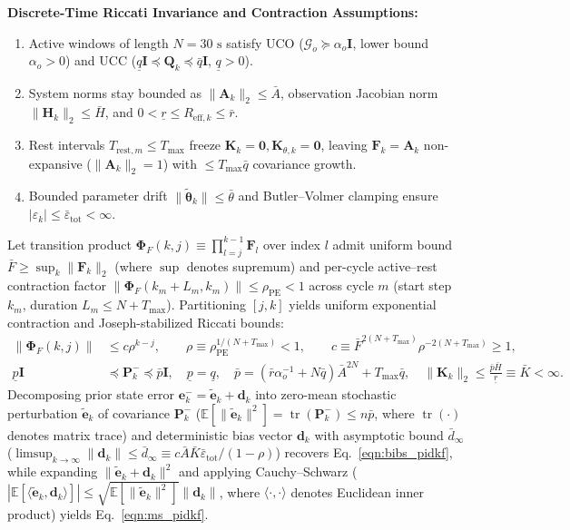 \documentclass[10pt,a4paper]{article}
\begin{document}
\noindent\textbf{Discrete-Time Riccati Invariance and Contraction Assumptions:}
\begin{enumerate}
\item[(A1)] Active windows of length $N = 30\text{ s}$ satisfy UCO ($\mathcal{G}_o \succeq \alpha_o \mathbf{I}$, lower bound $\alpha_o > 0$) and UCC ($\underline{q}\mathbf{I} \preceq \mathbf{Q}_k \preceq \bar{q}\mathbf{I}$, $\underline{q} > 0$).
\item[(A2)] System norms stay bounded as $\|\mathbf{A}_k\|_2 \le \bar{A}$, observation Jacobian norm $\|\mathbf{H}_k\|_2 \le \bar{H}$, and $0 < \underline{r} \le R_{\text{eff},k} \le \bar{r}$.
\item[(A3)] Rest intervals $T_{\text{rest},m} \le T_{\max}$ freeze $\mathbf{K}_k = \mathbf{0}, \mathbf{K}_{\theta,k} = \mathbf{0}$, leaving $\mathbf{F}_k = \mathbf{A}_k$ non-expansive ($\|\mathbf{A}_k\|_2 = 1$) with $\le T_{\max}\bar{q}$ covariance growth.
\item[(A4)] Bounded parameter drift $\|\tilde{\boldsymbol{\theta}}_k\| \le \bar{\theta}$ and Butler--Volmer clamping ensure $|\varepsilon_k| \le \bar{\varepsilon}_{\text{tot}} < \infty$.
\end{enumerate}
Let transition product $\boldsymbol{\Phi}_F(k, j) \equiv \prod_{l=j}^{k-1}\mathbf{F}_l$ over index $l$ admit uniform bound $\bar{F} \ge \sup_k \|\mathbf{F}_k\|_2$ (where $\sup$ denotes supremum) and per-cycle active--rest contraction factor $\|\boldsymbol{\Phi}_F(k_m + L_m, k_m)\| \le \rho_{\text{PE}} < 1$ across cycle $m$ (start step $k_m$, duration $L_m \le N + T_{\max}$). Partitioning $[j, k]$ yields uniform exponential contraction and Joseph-stabilized Riccati bounds:
\begin{align*}
\|\boldsymbol{\Phi}_F(k, j)\| &\le c\rho^{k-j}, \qquad
\rho \equiv \rho_{\text{PE}}^{1/(N + T_{\max})} < 1, \qquad
c \equiv \bar{F}^{2(N + T_{\max})} \rho^{-2(N + T_{\max})} \ge 1, \\
\underline{p}\mathbf{I} &\preceq \mathbf{P}_k^- \preceq \bar{p}\mathbf{I}, \quad
\underline{p} = \underline{q}, \quad \bar{p} = (\bar{r}\alpha_o^{-1} + N\bar{q})\bar{A}^{2N} + T_{\max}\bar{q}, \quad
\|\mathbf{K}_k\|_2 \le \frac{\bar{p}\bar{H}}{\underline{r}} \equiv \bar{K} < \infty.
\end{align*}
Decomposing prior state error $\mathbf{e}_k^- = \tilde{\mathbf{e}}_k + \mathbf{d}_k$ into zero-mean stochastic perturbation $\tilde{\mathbf{e}}_k$ of covariance $\mathbf{P}_k^-$ ($\mathbb{E}[\|\tilde{\mathbf{e}}_k\|^2] = \operatorname{tr}(\mathbf{P}_k^-) \le n\bar{p}$, where $\operatorname{tr}(\cdot)$ denotes matrix trace) and deterministic bias vector $\mathbf{d}_k$ with asymptotic bound $\bar{d}_\infty$ ($\limsup_{k\to\infty}\|\mathbf{d}_k\| \le \bar{d}_\infty \equiv c\bar{A}\bar{K}\bar{\varepsilon}_{\text{tot}}/(1-\rho)$) recovers Eq.~\eqref{eqn:bibs_pidkf}, while expanding $\|\tilde{\mathbf{e}}_k + \mathbf{d}_k\|^2$ and applying Cauchy--Schwarz ($|\mathbb{E}[\langle \tilde{\mathbf{e}}_k, \mathbf{d}_k \rangle]| \le \sqrt{\mathbb{E}[\|\tilde{\mathbf{e}}_k\|^2]}\|\mathbf{d}_k\|$, where $\langle \cdot, \cdot \rangle$ denotes Euclidean inner product) yields Eq.~\eqref{eqn:ms_pidkf}.

{\small{}
\let\oldbibitem\bibitem
\def\bibitem{\vspace{-4.5pt}\oldbibitem}


}
\end{document}
